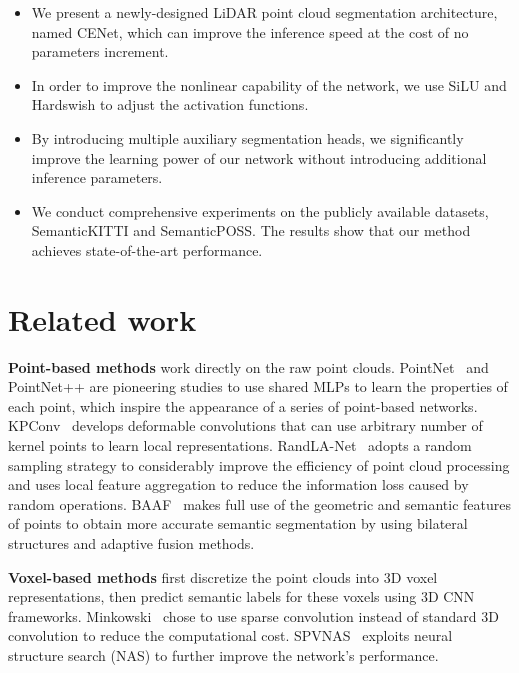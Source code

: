 \documentclass{article}
\begin{document}
\begin{itemize}[leftmargin=*]
\vspace{-1.5ex}
\item We present a newly-designed LiDAR point cloud segmentation architecture, named CENet, which can improve the inference speed at the cost of no parameters increment.
\vspace{-1.5ex}
\item In order to improve the nonlinear capability of the network, we use SiLU and Hardswish to adjust the activation functions.
\vspace{-1.5ex}
\item By introducing multiple auxiliary segmentation heads, we significantly improve the learning power of our network without introducing additional inference parameters.
\vspace{-1.5ex}
\item We conduct comprehensive experiments on the publicly available datasets, SemanticKITTI and SemanticPOSS. The results show that our method achieves state-of-the-art performance.
\end{itemize}

\section{Related work}
\label{sec:related work}
\textbf{Point-based methods} work directly on the raw point clouds. PointNet~\cite{qi2017pointnet} and PointNet++\cite{qi2017pointnet++} are pioneering studies to use shared MLPs to learn the properties of each point, which inspire the appearance of a series of point-based networks. KPConv~\cite{thomas2019kpconv} develops deformable convolutions that can use arbitrary number of kernel points to learn local representations. RandLA-Net~\cite{hu2020randla} adopts a random sampling strategy to considerably improve the efficiency of point cloud processing and uses local feature aggregation to reduce the information loss caused by random operations.  BAAF~\cite{qiu2021semantic} makes full use of the geometric and semantic features of points to obtain more accurate semantic segmentation by using bilateral structures and adaptive fusion methods. 


\noindent\textbf{Voxel-based methods} first discretize the point clouds into 3D voxel representations, then predict semantic labels for these voxels using 3D CNN frameworks. Minkowski~\cite{graham20183d} chose to use sparse convolution instead of standard 3D convolution to reduce the computational cost. SPVNAS~\cite{tang2020searching} exploits neural structure search (NAS) to further improve the network's performance. 
\end{document}
